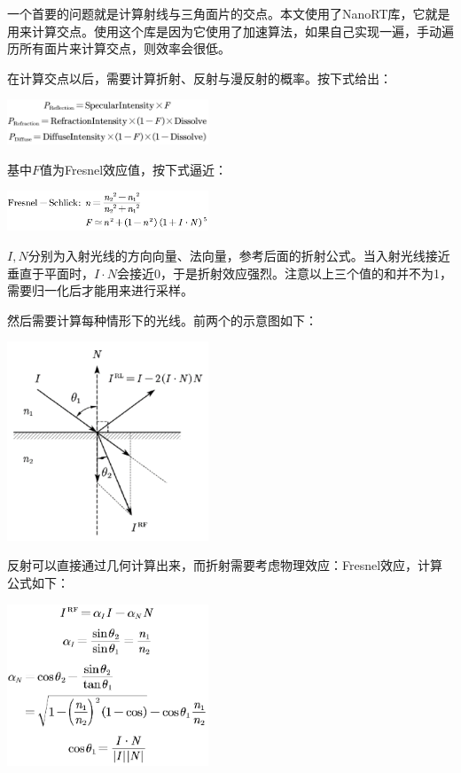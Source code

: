 一个首要的问题就是计算射线与三角面片的交点。本文使用了NanoRT库，它就是用来计算交点。使用这个库是因为它使用了加速算法，如果自己实现一遍，手动遍历所有面片来计算交点，则效率会很低。

在计算交点以后，需要计算折射、反射与漫反射的概率。按下式给出：

\begin{center}
\includegraphics[width=6cm]{figure/prob.png}
\label{prob}
\end{center}
基中$F$值为Fresnel效应值，按下式逼近：
\begin{center}
\includegraphics[width=6cm]{figure/fresnel.png}
\end{center}
$I,N$分别为入射光线的方向向量、法向量，参考后面的折射公式。当入射光线接近垂直于平面时，$I\cdot N$会接近0，于是折射效应强烈。注意以上三个值的和并不为1，需要归一化后才能用来进行采样。

然后需要计算每种情形下的光线。前两个的示意图如下：

\begin{center}
\includegraphics[width=6cm]{figure/reflection and refraction.png}
\end{center}

反射可以直接通过几何计算出来，而折射需要考虑物理效应：Fresnel效应，计算公式如下：

\begin{center}
\includegraphics[width=6cm]{figure/refraction formula.png}
\end{center}

